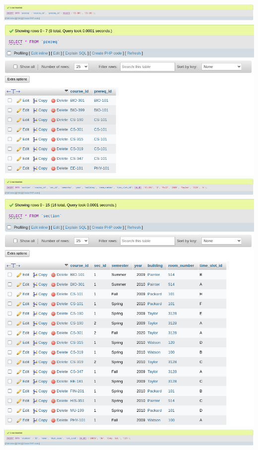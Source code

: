 \documentclass{article}
\begin{document}
\begin{center}
    \newpage
    \includegraphics[scale=0.5]{7-6i.png}
    \includegraphics[scale=0.5]{7-6s.png}
    \newpage
    \includegraphics[scale=0.5]{7-7i.png}
    \includegraphics[scale=0.5]{7-7s.png}
    \newpage
    \includegraphics[scale=0.5]{7-8i.png}

\end{center}
\end{document}
